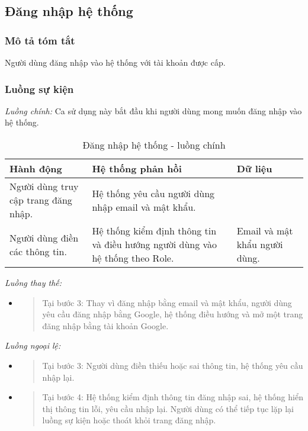 \documentclass[./../main.tex]{subfiles}
\begin{document}
\subsection{Đăng nhập hệ thống}

\subsubsection*{Mô tả tóm tắt}

Người dùng đăng nhập vào hệ thống với tài khoản được cấp.

\subsubsection*{Luồng sự kiện}

\emph{Luồng chính:} Ca sử dụng này bắt đầu khi người dùng mong muốn đăng
nhập vào hệ thống.

\begin{table}[H]
    \caption{Đăng nhập hệ thống - luồng chính}
    \label{tab:login_flow_main}
	\begin{tabularx}{\textwidth}{|X|X|X|}
		\hline
		\textbf{Hành động}                         & \textbf{Hệ thống phản hồi}                                                                      & \textbf{Dữ liệu}                   \\ \hline
		Người dùng truy cập trang đăng nhập. & Hệ thống yêu cầu người dùng nhập email và mật khẩu.                                   &                                        \\ \hline
		Người dùng điền các thông tin.        & Hệ thống kiểm định thông tin và điều hướng người dùng vào hệ thống theo Role. & Email và mật khẩu người dùng. \\ \hline
	\end{tabularx}
\end{table}

\emph{Luồng thay thế:}

\begin{itemize}
	\item
	      \begin{quote}
	      	Tại bước 3: Thay vì đăng nhập bằng email và mật khẩu, người dùng yêu
	      	cầu đăng nhập bằng Google, hệ thống điều hướng và mở một trang đăng
	      	nhập bằng tài khoản Google.
	      \end{quote}
\end{itemize}

\emph{Luồng ngoại lệ:}

\begin{itemize}
	\item
	      \begin{quote}
	      	Tại bước 3: Người dùng điền thiếu hoặc sai thông tin, hệ thống yêu cầu
	      	nhập lại.
	      \end{quote}
	\item
	      \begin{quote}
	      	Tại bước 4: Hệ thống kiểm định thông tin đăng nhập sai, hệ thống hiển
	      	thị thông tin lỗi, yêu cầu nhập lại. Người dùng có thể tiếp tục lặp
	      	lại luồng sự kiện hoặc thoát khỏi trang đăng nhập.
	      \end{quote}
\end{itemize}
\end{document}
